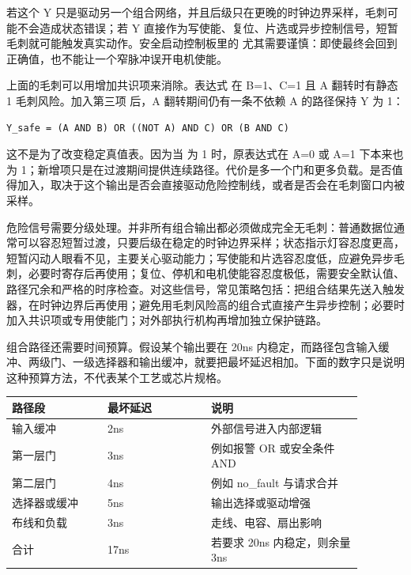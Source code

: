 若这个 Y 只是驱动另一个组合网络，并且后级只在更晚的时钟边界采样，毛刺可能不会造成状态错误；若 Y 直接作为写使能、复位、片选或异步控制信号，短暂毛刺就可能触发真实动作。安全启动控制板里的  尤其需要谨慎：即使最终会回到正确值，也不能让一个窄脉冲误开电机使能。

上面的毛刺可以用增加共识项来消除。表达式  在 B=1、C=1 且 A 翻转时有静态 1 毛刺风险。加入第三项  后，A 翻转期间仍有一条不依赖 A 的路径保持 Y 为 1：

\begin{lstlisting}
Y_safe = (A AND B) OR ((NOT A) AND C) OR (B AND C)
\end{lstlisting}

这不是为了改变稳定真值表。因为当  为 1 时，原表达式在 A=0 或 A=1 下本来也为 1；新增项只是在过渡期间提供连续路径。代价是多一个门和更多负载。是否值得加入，取决于这个输出是否会直接驱动危险控制线，或者是否会在毛刺窗口内被采样。

危险信号需要分级处理。并非所有组合输出都必须做成完全无毛刺：普通数据位通常可以容忍短暂过渡，只要后级在稳定的时钟边界采样；状态指示灯容忍度更高，短暂闪动人眼看不见，主要关心驱动能力；写使能和片选容忍度低，应避免异步毛刺，必要时寄存后再使用；复位、停机和电机使能容忍度极低，需要安全默认值、路径冗余和严格的时序检查。对这些信号，常见策略包括：把组合结果先送入触发器，在时钟边界后再使用；避免用毛刺风险高的组合式直接产生异步控制；必要时加入共识项或专用使能门；对外部执行机构再增加独立保护链路。

组合路径还需要时间预算。假设某个输出要在 20ns 内稳定，而路径包含输入缓冲、两级门、一级选择器和输出缓冲，就要把最坏延迟相加。下面的数字只是说明这种预算方法，不代表某个工艺或芯片规格。

\begin{longtable}{L{0.24\linewidth}L{0.26\linewidth}L{0.38\linewidth}}
\toprule
路径段 & 最坏延迟 & 说明 \\
\midrule
输入缓冲 & 2ns & 外部信号进入内部逻辑 \\
第一层门 & 3ns & 例如报警 OR 或安全条件 AND \\
第二层门 & 4ns & 例如 no\_fault 与请求合并 \\
选择器或缓冲 & 5ns & 输出选择或驱动增强 \\
布线和负载 & 3ns & 走线、电容、扇出影响 \\
合计 & 17ns & 若要求 20ns 内稳定，则余量 3ns \\
\bottomrule
\end{longtable}

